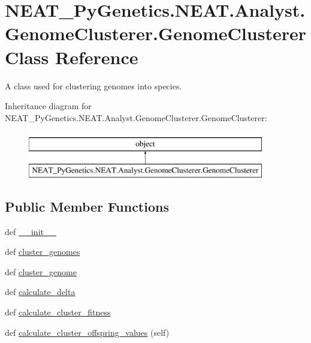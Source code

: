 \hypertarget{classNEAT__PyGenetics_1_1NEAT_1_1Analyst_1_1GenomeClusterer_1_1GenomeClusterer}{}\section{N\+E\+A\+T\+\_\+\+Py\+Genetics.\+N\+E\+A\+T.\+Analyst.\+Genome\+Clusterer.\+Genome\+Clusterer Class Reference}
\label{classNEAT__PyGenetics_1_1NEAT_1_1Analyst_1_1GenomeClusterer_1_1GenomeClusterer}


A class used for clustering genomes into species.  


Inheritance diagram for N\+E\+A\+T\+\_\+\+Py\+Genetics.\+N\+E\+A\+T.\+Analyst.\+Genome\+Clusterer.\+Genome\+Clusterer\+:\begin{figure}[H]
\begin{center}
\leavevmode
\includegraphics[height=2.000000cm]{classNEAT__PyGenetics_1_1NEAT_1_1Analyst_1_1GenomeClusterer_1_1GenomeClusterer}
\end{center}
\end{figure}
\subsection*{Public Member Functions}
\begin{DoxyCompactItemize}
\item 
def \hyperlink{classNEAT__PyGenetics_1_1NEAT_1_1Analyst_1_1GenomeClusterer_1_1GenomeClusterer_a2f18f1f814c59bc18bc896c67331db10}{\+\_\+\+\_\+init\+\_\+\+\_\+}
\item 
def \hyperlink{classNEAT__PyGenetics_1_1NEAT_1_1Analyst_1_1GenomeClusterer_1_1GenomeClusterer_a3cb27bd4e57fbae51f5638bf252d7d19}{cluster\+\_\+genomes}
\item 
def \hyperlink{classNEAT__PyGenetics_1_1NEAT_1_1Analyst_1_1GenomeClusterer_1_1GenomeClusterer_a4b17098e6b96981aa7a00ffe3c3510c8}{cluster\+\_\+genome}
\item 
def \hyperlink{classNEAT__PyGenetics_1_1NEAT_1_1Analyst_1_1GenomeClusterer_1_1GenomeClusterer_a057cec399fba67f9f90c70ad9158ec5e}{calculate\+\_\+delta}
\item 
def \hyperlink{classNEAT__PyGenetics_1_1NEAT_1_1Analyst_1_1GenomeClusterer_1_1GenomeClusterer_a5dba985534b3de86bb03574e683749f6}{calculate\+\_\+cluster\+\_\+fitness}
\item 
def \hyperlink{classNEAT__PyGenetics_1_1NEAT_1_1Analyst_1_1GenomeClusterer_1_1GenomeClusterer_a6bd0107d083dade08414c19ad9aaadaf}{calculate\+\_\+cluster\+\_\+offspring\+\_\+values} (self)
\end{DoxyCompactItemize}
